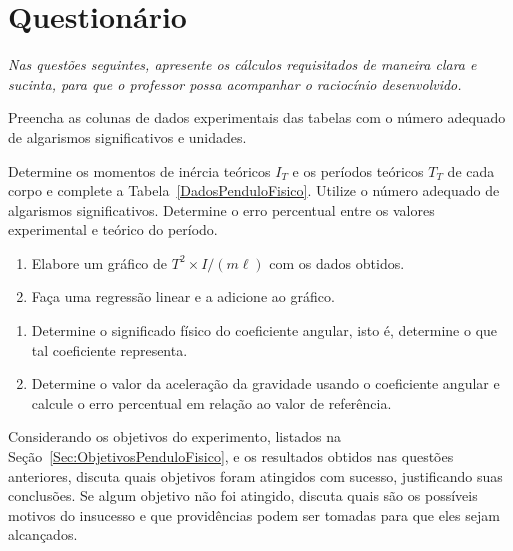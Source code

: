 \vspace{5mm}

\section{Questionário}
\emph{Nas questões seguintes, apresente os cálculos requisitados de maneira clara e sucinta, para que o professor possa acompanhar o raciocínio desenvolvido.}
\vspace{5mm}

\begin{question}[type={exam}]
Preencha as colunas de dados experimentais das tabelas com o número adequado de algarismos significativos e unidades.
\end{question}

\begin{question}[type={exam}]
Determine os momentos de inércia teóricos $I_T$ e os períodos teóricos $T_T$ de cada corpo e complete a Tabela~\ref{DadosPenduloFisico}. Utilize o número adequado de algarismos significativos. Determine o erro percentual entre os valores experimental e teórico do período.
\end{question}

\begin{question}[type={exam}]
\begin{enumerate}[label=\roman*.]
    \item Elabore um gráfico de $T^2 \times I/(m\ell)$ com os dados obtidos.
    \item Faça uma regressão linear e a adicione ao gráfico.
\end{enumerate}
\end{question}

\begin{question}[type={exam}]
\begin{enumerate}[label=\roman*.]
    \item Determine o significado físico do coeficiente angular, isto é, determine o que tal coeficiente representa.
    \item Determine o valor da aceleração da gravidade usando o coeficiente angular e calcule o erro percentual em relação ao valor de referência.
\end{enumerate}
\end{question}

\begin{question}[type={exam}]
Considerando os objetivos do experimento, listados na Seção~\ref{Sec:ObjetivosPenduloFisico}, e os resultados obtidos nas questões anteriores, discuta quais objetivos foram atingidos com sucesso, justificando suas conclusões. Se algum objetivo não foi atingido, discuta quais são os possíveis motivos do insucesso e que providências podem ser tomadas para que eles sejam alcançados.
\end{question}

